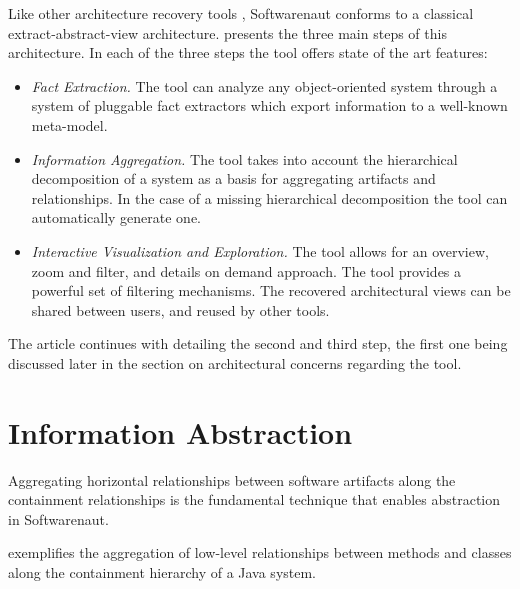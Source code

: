 \documentclass[preprint,12pt]{elsarticle}
\begin{document}
Like other architecture recovery tools \cite{pollet-sar}, Softwarenaut conforms to a classical extract-abstract-view architecture.  presents the three main steps of this architecture. In each of the three steps the tool offers state of the art features:

\begin{itemize}
\item {\em Fact Extraction.} The tool can analyze any object-oriented system through a system of pluggable fact extractors which export information to a well-known meta-model. 
\item {\em Information Aggregation.} The tool takes into account the hierarchical decomposition of a system as a basis for aggregating artifacts and relationships. In the case of a missing hierarchical decomposition the tool can automatically generate one.
\item {\em Interactive Visualization and Exploration.} The tool allows for an overview, zoom and filter, and details on demand approach. The tool provides a powerful set of filtering mechanisms. The recovered architectural views can be shared between users, and reused by other tools.
\end{itemize}

The article continues with detailing the second and third step, the first one being discussed later in the section on architectural concerns regarding the tool.



\section {Information Abstraction} \label{sec:org}

Aggregating horizontal relationships between software artifacts along the containment relationships is the fundamental technique that enables abstraction in Softwarenaut. 

 exemplifies the aggregation of low-level relationships between methods and classes along the containment hierarchy of a Java system. 
\end{document}
